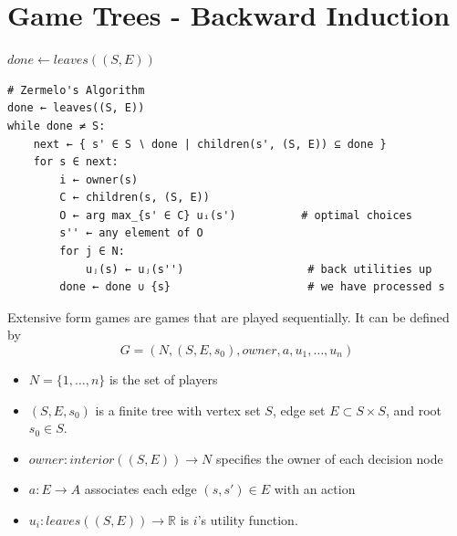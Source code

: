 \documentclass[12pt, a4paper]{article}
\begin{document}
\newpage

\section{Game Trees - Backward Induction}

\begin{algorithm}[H]
\caption{Zermelo's Algorithm}
\DontPrintSemicolon

$done \leftarrow leaves((S, E))$\;
\end{algorithm}
\begin{Verbatim}
# Zermelo's Algorithm
done ← leaves((S, E))
while done ≠ S:
    next ← { s' ∈ S ∖ done | children(s', (S, E)) ⊆ done }
    for s ∈ next:
        i ← owner(s)
        C ← children(s, (S, E))
        O ← arg max_{s' ∈ C} uᵢ(s')          # optimal choices
        s'' ← any element of O
        for j ∈ N:
            uⱼ(s) ← uⱼ(s'')                   # back utilities up
        done ← done ∪ {s}                     # we have processed s
\end{Verbatim}

\medskip
\noindent Extensive form games are games that are played sequentially. It can be defined by
\[G = (N, (S, E, s_0), owner, a, u_1,\ldots,u_n)\]
\begin{itemize}
        \item $N = \{1,\ldots,n\}$ is the set of players
        \item $(S, E, s_0)$ is a finite tree with vertex set $S$,
        edge set $E \subset S \times S$, and root $s_0 \in S$.
        \item $owner: interior((S, E))\rightarrow N$ specifies the owner of each decision node
        \item $a: E \rightarrow A$ associates each edge $(s, s') \in E$ with an action
        \item $u_i : leaves((S, E))\rightarrow\mathbb{R}$ is $i$'s utility function.
\end{itemize}
\end{document}
